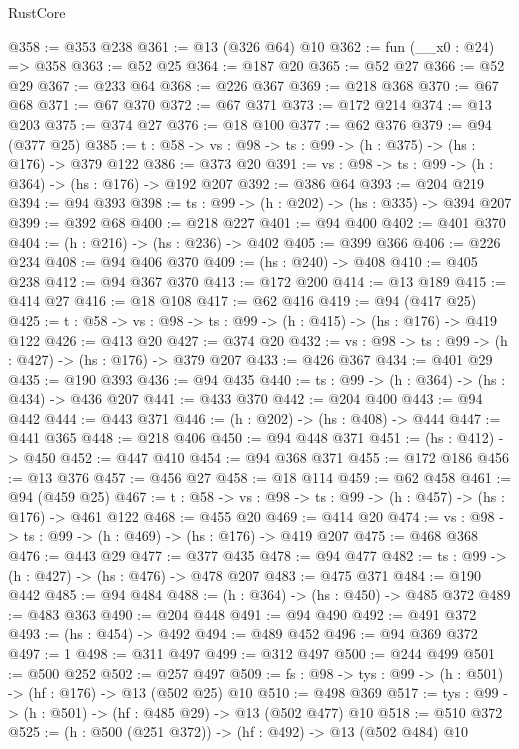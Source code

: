 \begin{lexlean}{RustCore}
\begin{coremodule}
@358 := @353 @238
@361 := @13 (@326 @64) @10
@362 := fun (__x0 : @24) => @358
@363 := @52 @25
@364 := @187 @20
@365 := @52 @27
@366 := @52 @29
@367 := @233 @64
@368 := @226 @367
@369 := @218 @368
@370 := @67 @68
@371 := @67 @370
@372 := @67 @371
@373 := @172 @214
@374 := @13 @203
@375 := @374 @27
@376 := @18 @100
@377 := @62 @376
@379 := @94 (@377 @25)
@385 := {t : @58} -> {vs : @98} -> {ts : @99} -> (h : @375) -> (hs : @176) -> @379 @122
@386 := @373 @20
@391 := {vs : @98} -> {ts : @99} -> (h : @364) -> (hs : @176) -> @192 @207
@392 := @386 @64
@393 := @204 @219
@394 := @94 @393
@398 := {ts : @99} -> (h : @202) -> (hs : @335) -> @394 @207
@399 := @392 @68
@400 := @218 @227
@401 := @94 @400
@402 := @401 @370
@404 := (h : @216) -> (hs : @236) -> @402
@405 := @399 @366
@406 := @226 @234
@408 := @94 @406 @370
@409 := (hs : @240) -> @408
@410 := @405 @238
@412 := @94 @367 @370
@413 := @172 @200
@414 := @13 @189
@415 := @414 @27
@416 := @18 @108
@417 := @62 @416
@419 := @94 (@417 @25)
@425 := {t : @58} -> {vs : @98} -> {ts : @99} -> (h : @415) -> (hs : @176) -> @419 @122
@426 := @413 @20
@427 := @374 @20
@432 := {vs : @98} -> {ts : @99} -> (h : @427) -> (hs : @176) -> @379 @207
@433 := @426 @367
@434 := @401 @29
@435 := @190 @393
@436 := @94 @435
@440 := {ts : @99} -> (h : @364) -> (hs : @434) -> @436 @207
@441 := @433 @370
@442 := @204 @400
@443 := @94 @442
@444 := @443 @371
@446 := (h : @202) -> (hs : @408) -> @444
@447 := @441 @365
@448 := @218 @406
@450 := @94 @448 @371
@451 := (hs : @412) -> @450
@452 := @447 @410
@454 := @94 @368 @371
@455 := @172 @186
@456 := @13 @376
@457 := @456 @27
@458 := @18 @114
@459 := @62 @458
@461 := @94 (@459 @25)
@467 := {t : @58} -> {vs : @98} -> {ts : @99} -> (h : @457) -> (hs : @176) -> @461 @122
@468 := @455 @20
@469 := @414 @20
@474 := {vs : @98} -> {ts : @99} -> (h : @469) -> (hs : @176) -> @419 @207
@475 := @468 @368
@476 := @443 @29
@477 := @377 @435
@478 := @94 @477
@482 := {ts : @99} -> (h : @427) -> (hs : @476) -> @478 @207
@483 := @475 @371
@484 := @190 @442
@485 := @94 @484
@488 := (h : @364) -> (hs : @450) -> @485 @372
@489 := @483 @363
@490 := @204 @448
@491 := @94 @490
@492 := @491 @372
@493 := (hs : @454) -> @492
@494 := @489 @452
@496 := @94 @369 @372
@497 := 1
@498 := @311 @497
@499 := @312 @497
@500 := @244 @499
@501 := @500 @252
@502 := @257 @497
@509 := {fs : @98} -> {tys : @99} -> (h : @501) -> (hf : @176) -> @13 (@502 @25) @10
@510 := @498 @369
@517 := {tys : @99} -> (h : @501) -> (hf : @485 @29) -> @13 (@502 @477) @10
@518 := @510 @372
@525 := (h : @500 (@251 @372)) -> (hf : @492) -> @13 (@502 @484) @10

\end{coremodule}
\end{lexlean}
